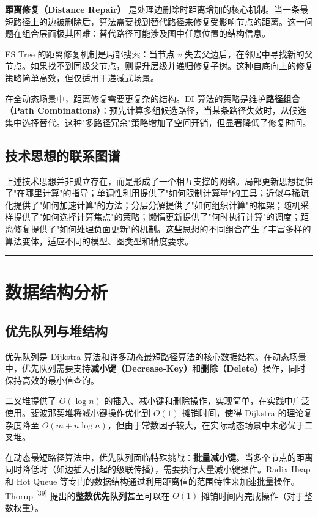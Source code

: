 \documentclass[12pt,a4paper]{ctexart}
\let\oldsection\section
\renewcommand{\section}{\clearpage\oldsection}
\begin{document}
\textbf{距离修复（Distance Repair）} 是处理边删除时距离增加的核心机制。当一条最短路径上的边被删除后，算法需要找到替代路径来修复受影响节点的距离。这一问题在组合层面极其困难：替代路径可能涉及图中任意位置的结构信息。

ES Tree 的距离修复机制是局部搜索：当节点 $v$ 失去父边后，在邻居中寻找新的父节点。如果找不到同级父节点，则提升层级并递归修复子树。这种自底向上的修复策略简单高效，但仅适用于递减式场景。

在全动态场景中，距离修复需要更复杂的结构。DI 算法的策略是维护\textbf{路径组合（Path Combinations）}：预先计算多组候选路径，当某条路径失效时，从候选集中选择替代。这种"多路径冗余"策略增加了空间开销，但显著降低了修复时间。

\subsection{技术思想的联系图谱}

上述技术思想并非孤立存在，而是形成了一个相互支撑的网络。局部更新思想提供了"在哪里计算"的指导；单调性利用提供了"如何限制计算量"的工具；近似与稀疏化提供了"如何加速计算"的方法；分层分解提供了"如何组织计算"的框架；随机采样提供了"如何选择计算焦点"的策略；懒惰更新提供了"何时执行计算"的调度；距离修复提供了"如何处理负面更新"的机制。这些思想的不同组合产生了丰富多样的算法变体，适应不同的模型、图类型和精度要求。

\noindent\rule{\textwidth}{0.4pt}
\section{数据结构分析}

\subsection{优先队列与堆结构}

优先队列是 Dijkstra 算法和许多动态最短路径算法的核心数据结构。在动态场景中，优先队列需要支持\textbf{减小键（Decrease-Key）}和\textbf{删除（Delete）}操作，同时保持高效的最小值查询。

二叉堆提供了 $O(\log n)$ 的插入、减小键和删除操作，实现简单，在实践中广泛使用。斐波那契堆将减小键操作优化到 $O(1)$ 摊销时间，使得 Dijkstra 的理论复杂度降至 $O(m+n\log n)$，但由于常数因子较大，在实际动态场景中未必优于二叉堆。

在动态最短路径算法中，优先队列面临特殊挑战：\textbf{批量减小键}。当多个节点的距离同时降低时（如边插入引起的级联传播），需要执行大量减小键操作。Radix Heap 和 Hot Queue 等专门的数据结构通过利用距离值的范围特性来加速批量操作。Thorup \textsuperscript{[39]}  提出的\textbf{整数优先队列}甚至可以在 $O(1)$ 摊销时间内完成操作（对于整数权重）。
\end{document}
